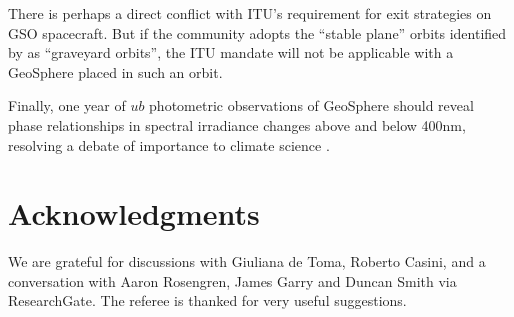 \documentclass[useAMS,usenatbib]{mn2e}
\newcommand{\highlight}{\color{red} }
\renewcommand{\highlight}{}
\newcommand\name{LAMBERT}
\renewcommand\name{GeoSphere}
\begin{document}
There is perhaps a direct conflict with ITU's requirement for exit
strategies on GSO spacecraft.  But if the community adopts the
``stable plane'' orbits identified by \citet{Friesen+others1992} 
as ``graveyard orbits'', the ITU mandate will not be applicable
with a \name{} placed in such an orbit.

{%
Finally, one year of $ub$ photometric observations of \name{} 
should reveal phase relationships in spectral irradiance changes above and below 400nm, 
 resolving a debate of importance to climate science \citep{Harder+others2009}.}

\section*{Acknowledgments}

We are grateful for discussions with Giuliana de Toma, Roberto Casini, 
and a conversation with Aaron Rosengren, James Garry and Duncan Smith via
ResearchGate.  {\highlight The referee is thanked for very useful suggestions. }
\end{document}

